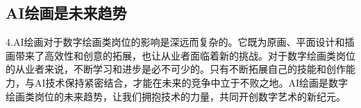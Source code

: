 \documentclass[a4paper,12pt]{ctexart} %
\begin{document}
	\subsection{AI绘画是未来趋势}4.AI绘画对于数字绘画类岗位的影响是深远而复杂的。它既为原画、平面设计和插画带来了高效性和创意的拓展，也让从业者面临着新的挑战。对于数字绘画类岗位的从业者来说，不断学习和进步是必不可少的。只有不断拓展自己的技能和创作能力，与AI技术保持紧密结合，才能在未来的竞争中立于不败之地。AI绘画是数字绘画类岗位的未来趋势，让我们拥抱技术的力量，共同开创数字艺术的新纪元。
\end{document}
